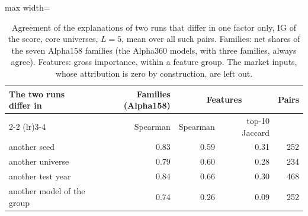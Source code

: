 \begin{table}[htbp]
\centering
\small
\begin{adjustbox}{max width=\textwidth}
\begin{tabular}{@{}lrrrr@{}}
\toprule
\textbf{The two runs differ in} & \textbf{Families (Alpha158)} & \multicolumn{2}{c}{\textbf{Features}} & \textbf{Pairs} \\
\cmidrule(lr){2-2} \cmidrule(lr){3-4}
 & Spearman & Spearman & top-10 Jaccard & \\
\midrule
another seed & 0.83 & 0.59 & 0.31 & 252 \\
another universe & 0.79 & 0.60 & 0.28 & 234 \\
another test year & 0.84 & 0.66 & 0.30 & 468 \\
another model of the group & 0.74 & 0.26 & 0.09 & 252 \\
\bottomrule
\end{tabular}
\end{adjustbox}
\caption{Agreement of the explanations of two runs that differ in one factor only, IG of the score, core universes, $L = 5$, mean over all such pairs. Families: net shares of the seven Alpha158 families (the Alpha360 models, with three families, always agree). Features: gross importance, within a feature group. The market inputs, whose attribution is zero by construction, are left out.}
\label{tab:res_agreement}
\end{table}
